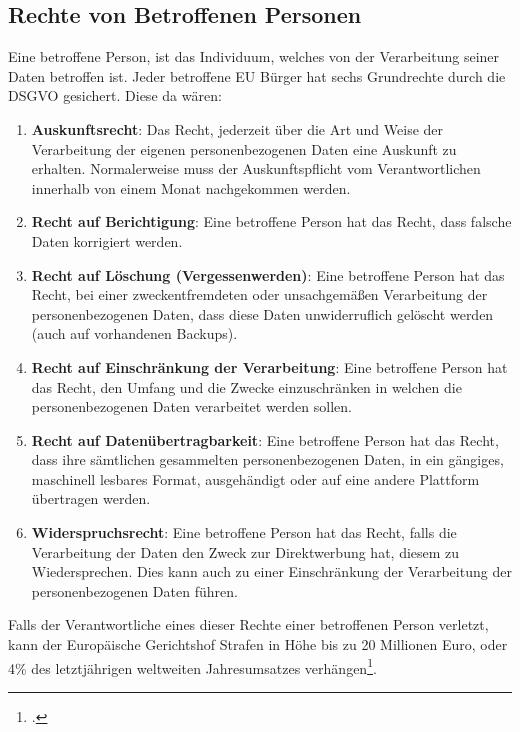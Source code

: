 \subsection{Rechte von Betroffenen Personen}
Eine betroffene Person, ist das Individuum, welches von der Verarbeitung seiner Daten betroffen ist.
Jeder betroffene EU Bürger hat sechs Grundrechte durch die DSGVO gesichert.
Diese da wären:

\begin{enumerate}
    \item \textbf{Auskunftsrecht}: Das Recht, jederzeit über die Art und Weise der Verarbeitung der eigenen personenbezogenen Daten eine Auskunft zu erhalten. Normalerweise muss der Auskunftspflicht vom Verantwortlichen innerhalb von einem Monat nachgekommen werden.
    \item \textbf{Recht auf Berichtigung}: Eine betroffene Person hat das Recht, dass falsche Daten korrigiert werden.
    \item \textbf{Recht auf Löschung (Vergessenwerden)}: Eine betroffene Person hat das Recht, bei einer zweckentfremdeten oder unsachgemäßen Verarbeitung der personenbezogenen Daten, dass diese Daten unwiderruflich gelöscht werden (auch auf vorhandenen Backups).
    \item \textbf{Recht auf Einschränkung der Verarbeitung}: Eine betroffene Person hat das Recht, den Umfang und die Zwecke einzuschränken in welchen die personenbezogenen Daten verarbeitet werden sollen.
    \item \textbf{Recht auf Datenübertragbarkeit}: Eine betroffene Person hat das Recht, dass ihre sämtlichen gesammelten personenbezogenen Daten, in ein gängiges, maschinell lesbares Format, ausgehändigt oder auf eine andere Plattform übertragen werden.
    \item \textbf{Widerspruchsrecht}: Eine betroffene Person hat das Recht, falls die Verarbeitung der Daten den Zweck zur Direktwerbung hat, diesem zu Wiedersprechen. Dies kann auch zu einer Einschränkung der Verarbeitung der personenbezogenen Daten führen.
\end{enumerate}
    
Falls der Verantwortliche eines dieser Rechte einer betroffenen Person verletzt, kann der Europäische Gerichtshof Strafen in Höhe bis zu 20 Millionen Euro, oder 4\% des letztjährigen weltweiten Jahresumsatzes verhängen\footcite{Lehrunterlagen-HTL-cloud}.

